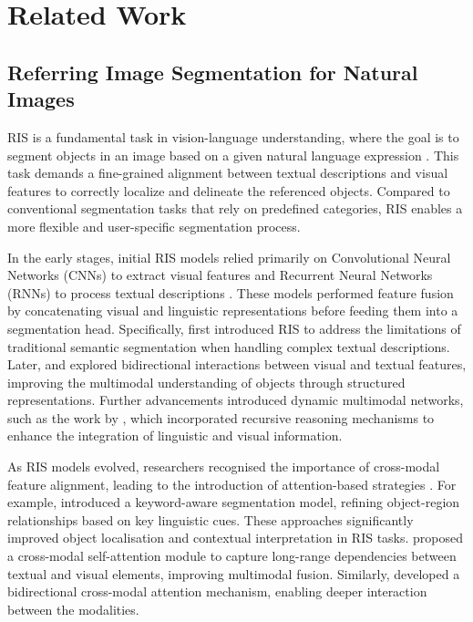 \section{Related Work}
\label{sec:2}

\subsection{Referring Image Segmentation for Natural Images}
\label{sec:2.1}
RIS is a fundamental task in vision-language understanding, where the goal is to segment objects in an image based on a given natural language expression \citep{li2018referring, yu2016modeling, yu2018mattnet}. This task demands a fine-grained alignment between textual descriptions and visual features to correctly localize and delineate the referenced objects. Compared to conventional segmentation tasks that rely on predefined categories, RIS enables a more flexible and user-specific segmentation process.

In the early stages, initial RIS models relied primarily on Convolutional Neural Networks (CNNs) to extract visual features and Recurrent Neural Networks (RNNs) to process textual descriptions \citep{li2018referring, hu2016segmentation, nagaraja2016modeling}. These models performed feature fusion by concatenating visual and linguistic representations before feeding them into a segmentation head. Specifically, \cite{hu2016segmentation} first introduced RIS to address the limitations of traditional semantic segmentation when handling complex textual descriptions. Later, \cite{li2018referring} and  \cite{nagaraja2016modeling} explored bidirectional interactions between visual and textual features, improving the multimodal understanding of objects through structured representations. Further advancements introduced dynamic multimodal networks, such as the work by \cite{margffoy2018dynamic}, which incorporated recursive reasoning mechanisms to enhance the integration of linguistic and visual information.

As RIS models evolved, researchers recognised the importance of cross-modal feature alignment, leading to the introduction of attention-based strategies \citep{shi2018key, ye2019cross, hu2020bi}. For example, \cite{shi2018key} introduced a keyword-aware segmentation model, refining object-region relationships based on key linguistic cues. These approaches significantly improved object localisation and contextual interpretation in RIS tasks.  \cite{ye2019cross} proposed a cross-modal self-attention module to capture long-range dependencies between textual and visual elements, improving multimodal fusion. Similarly, \cite{hu2020bi} developed a bidirectional cross-modal attention mechanism, enabling deeper interaction between the modalities.

